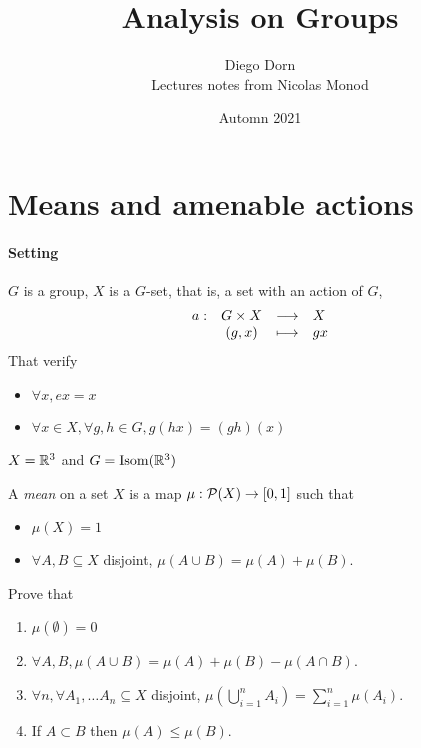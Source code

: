 


\title{Analysis on Groups}
\author{Diego Dorn \\ Lectures notes from Nicolas Monod}
\date{Automn 2021}

\newcommand{\Isom}{\mathrm{Isom}}
\newcommand{\Acts}{\curvearrowright}


    \maketitle


    \section{Means and amenable actions}

    \paragraph{Setting} $G$ is a group, 
    $X$ is a $G$-set, that is, a set with an action of $G$, 
    \[
        \begin{array}{rccl} a : & G \times X & \longrightarrow & X \\ & (g, x) & \longmapsto & gx \end{array}
    \]
    That verify \begin{itemize}
        \item $\forall x, ex = x$
        \item $\forall x \in X, \forall g, h \in G, g(hx) = (gh)(x)$
    \end{itemize}

    \begin{example}
        $X = \mathbb R^3$ and $G = \Isom(\R^3)$
    \end{example}

    \begin{definition}
        A \emph{mean} on a set $X$ is a map 
        $\mu: \mathcal{P}(X) \to [0, 1]$
        such that \begin{itemize}
            \item $\mu(X) = 1$
            \item $\forall A, B \subseteq X$ disjoint, 
                $\mu(A \cup B) = \mu(A) + \mu(B)$.
        \end{itemize}
    \end{definition}

    \begin{exercise}
        Prove that 
        \begin{enumerate}
            \item $\mu(\emptyset) = 0$
            \item $\forall A, B, \mu(A \cup B) = \mu(A) + \mu(B) - \mu(A \cap B)$.
            \item $\forall n, \forall A_1, \dots A_n \subseteq X$ disjoint,
                $\mu(\bigcup_{i = 1}^n A_i) = \sum_{i = 1}^n \mu(A_i)$.
            \item If $A \subset B$ then $\mu(A) \leq \mu(B)$.
        \end{enumerate}
    \end{exercise}

